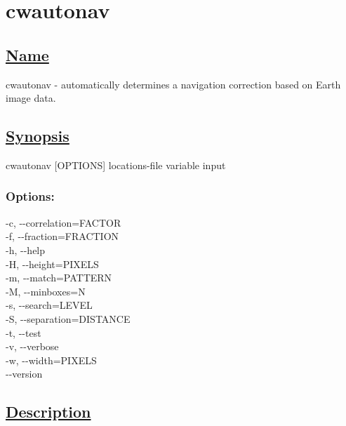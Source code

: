 \newpage
\section{cwautonav} \hypertarget{cwautonav}{}
\subsection*{\underline{Name}}


   cwautonav - automatically determines a navigation correction based on Earth image data.  
\subsection*{\underline{Synopsis}}


 cwautonav [OPTIONS] locations-file variable input
\subsubsection*{Options:}


  -c, -{-}correlation=FACTOR \\ 
 -f, -{-}fraction=FRACTION \\ 
 -h, -{-}help \\ 
 -H, -{-}height=PIXELS \\ 
 -m, -{-}match=PATTERN \\ 
 -M, -{-}minboxes=N \\ 
 -s, -{-}search=LEVEL \\ 
 -S, -{-}separation=DISTANCE \\ 
 -t, -{-}test \\ 
 -v, -{-}verbose \\ 
 -w, -{-}width=PIXELS \\ 
 -{-}version \\ 

\subsection*{\underline{Description}}


